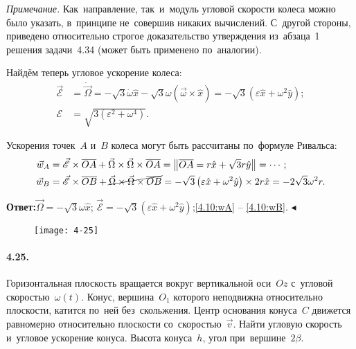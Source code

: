 \documentclass{weekly}
\begin{document}
\textsl{Примечание.} Как~направление, так~и~модуль угловой скорости
колеса можно было указать, в~принципе не~совершив никаких вычислений.
С~другой стороны, приведено относительно строгое доказательство
утверждения из~абзаца~1 решения задачи~4.34 (может быть применено
по~аналогии).

Найдём теперь угловое ускорение колеса:
\begin{align}
    \vec{\mathscr{E}} &= \dot{\vec\Omega}
        = -\sqrt{3} \dot\omega \hat x -
            \sqrt{3} \omega \left(\vec\omega \times \hat x\right)
        = -\sqrt{3} \left( \varepsilon \hat x + \omega^2 \hat y \right);
\\
    \mathscr{E} &= \sqrt{3 \left(\varepsilon^2 + \omega^4\right)}.
\end{align}

Ускорения точек~$A$ и~$B$ колеса могут быть рассчитаны
по~формуле Ривальса:
\begin{align}
    \vec w_A &= \vec{\mathscr{E}} \times \overline{OA} +
            \vec\Omega \times \vec\Omega \times \overline{OA}
        = \begin{Vmatrix} \overline{OA} = r\hat x + \sqrt{3}r \hat y \end{Vmatrix}
        = \cdots; \label{4.10:wA} \\
    \vec w_B &= \vec{\mathscr{E}} \times \overline{OB} +
            \cancel{\vec\Omega \times \vec\Omega \times \overline{OB}}
        = -\sqrt{3} \left( \varepsilon \hat x + \omega^2 \hat y \right)
            \times 2r \hat x
        = -2\sqrt{3} \omega^2 r. \label{4.10:wB}
\end{align}

\textbf{Ответ:}\quad $\vec{\Omega} = -\sqrt{3}\omega \hat x$;\qquad
$\vec{\mathscr{E}} = -\sqrt{3} \left( \varepsilon \hat x +
\omega^2 \hat y \right)$;\qquad \eqref{4.10:wA} -- \eqref{4.10:wB}.
\hfill $\blacktriangleleft$


\begin{wrapfigure}[13]{l}{6cm}\vspace{-2mm}
    \texttt{[image: 4-25]}
\end{wrapfigure}
\paragraph{4.25.} Горизонтальная плоскость вращается вокруг
вертикальной оси~$Oz$ с~угловой скоростью~$\omega(t)$.
Конус, вершина~$O_1$ которого неподвижна относительно плоскости,
катится по~ней без~скольжения. Центр основания конуса~$C$
движется равномерно относительно плоскости со~скоростью~$\vec v$.
Найти угловую скорость и~угловое ускорение конуса.
Высота конуса~$h$, угол при~вершине~$2\beta$.
\end{document}
